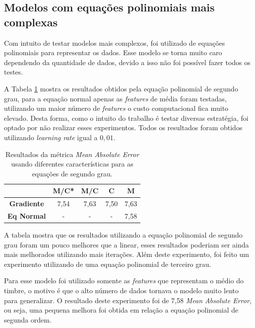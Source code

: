 \documentclass[conference]{IEEEtran}
\begin{document}
\subsection{Modelos com equações polinomiais mais complexas}

Com intuito de testar modelos mais complexos, foi utilizado de equações polinomiais para representar os dados. Esse modelo se torna muito caro dependendo da quantidade de dados, devido a isso não foi possível fazer todos os testes.

A Tabela \ref{tab:comp} mostra os resultados obtidos pela equação polinomial de segundo grau, para a equação normal apenas as \emph{features} de média foram testadas, utilizando um maior número de \emph{features} o custo computacional fica muito elevado. Desta forma, como o intuito do trabalho é testar diversas estratégia, foi optado por não realizar esses experimentos. Todos os resultados foram obtidos utilizando \emph{learning rate} igual a $0,01$.

\begin{table}[!h]
	\centering

	\begin{tabular}{ccccc} \\ \hline
		\backslashbox{\textbf{Modelos}}{\textbf{Features}} & \textbf{M/C*} & \textbf{M/C} & \textbf{C} & \textbf{M} \\ \hline
		\textbf{Gradiente}      & 7,54     & 7,63         & 7,50       & 7,63  \\
		\textbf{Eq Normal}      & -       & -         & -       & 7,58    \\ \hline
	\end{tabular}
	\caption{Resultados da métrica \textit{Mean Absolute Error} usando diferentes características para as equações de segundo grau.}
	\label{tab:comp}
\end{table}

A tabela mostra que os resultados utilizando a equação polinomial de segundo grau foram um pouco melhores que a linear, esses resultados poderiam ser ainda mais melhorados utilizando mais iterações. Além deste experimento, foi feito um experimento utilizando de uma equação polinomial de terceiro grau.

Para esse modelo foi utilizado somente as \emph{features} que representam o médio do timbre, o motivo é que o alto número de dados tornava o modelo muito lento para generalizar. O resultado deste experimento foi de 7,58 \emph{Mean Absolute Error}, ou seja, uma pequena melhora foi obtida em relação a equação polinomial de segunda ordem.
\end{document}
